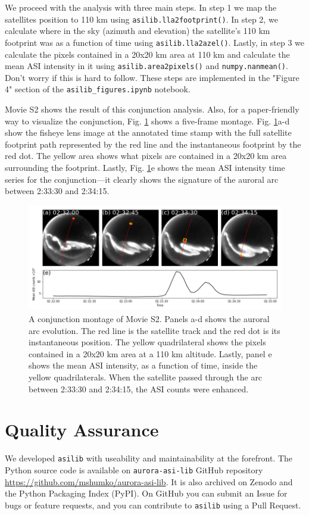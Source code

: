 \documentclass[draft]{agujournal2019}
\begin{document}
We proceed with the analysis with three main steps. In step 1 we map the satellites position to 110 km using \verb|asilib.lla2footprint()|. In step 2, we calculate where in the sky (azimuth and elevation) the satellite's 110 km footprint was as a function of time using \verb|asilib.lla2azel()|. Lastly, in step 3 we calculate the pixels contained in a 20x20 km area at 110 km and calculate the mean ASI intensity in it using \verb|asilib.area2pixels()| and \verb|numpy.nanmean()|. Don't worry if this is hard to follow. These steps are implemented in the "Figure 4" section of the \verb|asilib_figures.ipynb| notebook.

Movie S2 shows the result of this conjunction analysis. Also, for a paper-friendly way to visualize the conjunction, Fig. \ref{fig4} shows a five-frame montage. Fig. \ref{fig4}a-d show the fisheye lens image at the annotated time stamp with the full satellite footprint path represented by the red line and the instantaneous footprint by the red dot. The yellow area shows what pixels are contained in a 20x20 km area surrounding the footprint. Lastly, Fig. \ref{fig4}e shows the mean ASI intensity time series for the conjunction---it clearly shows the signature of the auroral arc between 2:33:30 and 2:34:15.

\begin{figure}
      \includegraphics[width=\textwidth]{figures/fig4.png}
      \caption{A conjunction montage of Movie S2. Panels a-d shows the auroral arc evolution. The red line is the satellite track and the red dot is its instantaneous position. The yellow quadrilateral shows the pixels contained in a 20x20 km area at a 110 km altitude. Lastly, panel e shows the mean ASI intensity, as a function of time, inside the yellow quadrilaterals. When the satellite passed through the arc between 2:33:30 and 2:34:15, the ASI counts were enhanced.}
      \label{fig4}
\end{figure}

\section{Quality Assurance}
We developed \verb|asilib| with useability and maintainability at the forefront. The Python source code is available on \verb|aurora-asi-lib| GitHub repository \url{https://github.com/mshumko/aurora-asi-lib}. It is also archived on Zenodo and the Python Packaging Index (PyPI). On GitHub you can submit an Issue for bugs or feature requests, and you can contribute to \verb|asilib| using a Pull Request. 
\end{document}
